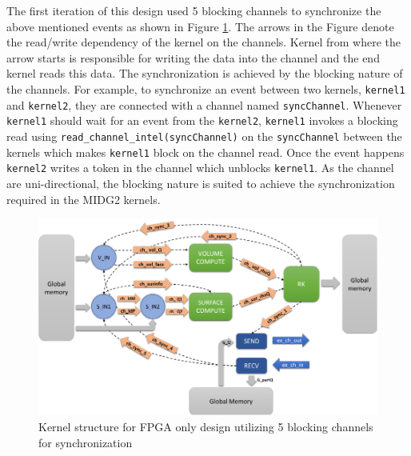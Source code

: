 The first iteration of this design used 5 blocking channels to synchronize the above mentioned
events as shown in Figure \ref{fig:channelsync_kernstruc}.
The arrows in the Figure denote the read/write dependency of the kernel on the channels.
Kernel from where the arrow starts is responsible for writing the data into the channel
and the end kernel reads this data. The synchronization is achieved by the blocking
nature of the channels. For example, to synchronize an event between two kernels,
\texttt{kernel1} and \texttt{kernel2}, they are connected with a channel named \texttt{syncChannel}.
Whenever \texttt{kernel1} should wait for an event from the \texttt{kernel2},
\texttt{kernel1} invokes a blocking read using \texttt{read\_channel\_intel(syncChannel)} on the
\texttt{syncChannel} between the kernels which makes
\texttt{kernel1} block on the channel read. Once the event happens \texttt{kernel2} writes a token in the channel
which unblocks \texttt{kernel1}. As the channel are uni-directional, the blocking nature is suited
to achieve the synchronization required in the MIDG2 kernels.

\begin{figure}[ht]%
    \centering
    \includegraphics[width=1.0\textwidth]{images/channelssync_kernstruc}
    \caption{Kernel structure for FPGA only design utilizing 5 blocking channels for synchronization}
    \label{fig:channelsync_kernstruc}
\end{figure}

